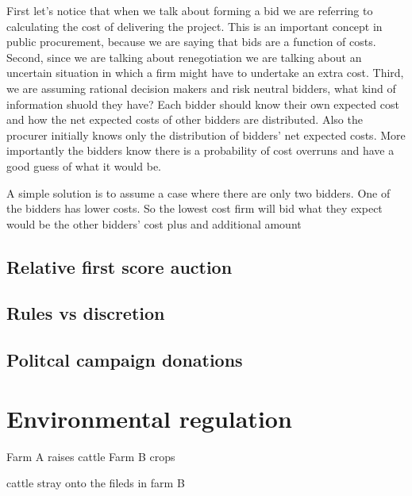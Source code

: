 \documentclass[11pt]{article} %
\begin{document}
First let's notice that when we talk about forming a bid we are referring to calculating the cost of delivering the project. This is an important concept in public procurement, because we are saying that bids are a function of costs.
Second, since we are talking about renegotiation we are talking about an uncertain situation in which a firm might have to undertake an extra cost.
Third, we are assuming rational decision makers and risk neutral bidders, what kind of information shuold they have? Each bidder should know their own expected cost and how the net expected costs of other bidders are distributed. Also the procurer initially knows only the distribution of bidders' net expected costs. More importantly the bidders know there is a probability of cost overruns and have a good guess of what it would be.

A simple solution is to assume a case where there are only two bidders. One of the bidders has lower costs. So the lowest cost firm will bid what they expect would be the other bidders' cost plus and additional amount

\subsection{Relative first score auction}


\subsection{Rules vs discretion}


\subsection{Politcal campaign donations}


\section{Environmental regulation}

Farm A raises cattle 
Farm B crops

cattle stray onto the fileds in farm B
\end{document}
